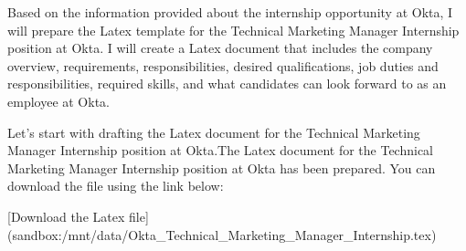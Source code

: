 Based on the information provided about the internship opportunity at Okta, I will prepare the Latex template for the Technical Marketing Manager Internship position at Okta. I will create a Latex document that includes the company overview, requirements, responsibilities, desired qualifications, job duties and responsibilities, required skills, and what candidates can look forward to as an employee at Okta.

Let's start with drafting the Latex document for the Technical Marketing Manager Internship position at Okta.The Latex document for the Technical Marketing Manager Internship position at Okta has been prepared. You can download the file using the link below:

[Download the Latex file](sandbox:/mnt/data/Okta_Technical_Marketing_Manager_Internship.tex)
